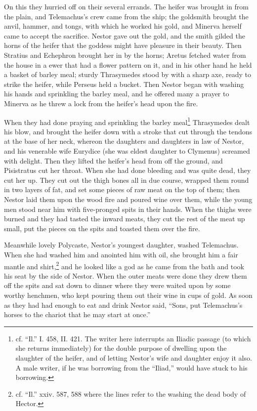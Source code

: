 On this they hurried off on their several errands. The heifer was brought in
from the plain, and Telemachus’s crew came from the ship; the goldsmith brought
the anvil, hammer, and tongs, with which he worked his gold, and Minerva
herself came to accept the sacrifice. Nestor gave out the gold, and the smith
gilded the horns of the heifer that the goddess might have pleasure in their
beauty. Then Stratius and Echephron brought her in by the horns; Aretus fetched
water from the house in a ewer that had a flower pattern on it, and in his
other hand he held a basket of barley meal; sturdy Thrasymedes stood by with a
sharp axe, ready to strike the heifer, while Perseus held a bucket. Then Nestor
began with washing his hands and sprinkling the barley meal, and he offered
many a prayer to Minerva as he threw a lock from the heifer’s head upon the
fire.

When they had done praying and sprinkling the barley meal\footnote{cf. “Il.” I. 458, II. 421. The writer here interrupts an Iliadic passage (to
which she returns immediately) for the double purpose of dwelling upon the
slaughter of the heifer, and of letting Nestor’s wife and daughter enjoy it
also. A male writer, if he was borrowing from the “Iliad,” would have stuck to
his borrowing.} Thrasymedes dealt his blow, and
brought the heifer down with a stroke that cut through the tendons at the base
of her neck, whereon the daughters and daughters in law of Nestor, and his
venerable wife Eurydice (she was eldest daughter to Clymenus) screamed with
delight. Then they lifted the heifer’s head from off the ground, and
Pisistratus cut her throat. When she had done bleeding and was quite dead, they
cut her up. They cut out the thigh bones all in due course, wrapped them round
in two layers of fat, and set some pieces of raw meat on the top of them; then
Nestor laid them upon the wood fire and poured wine over them, while the young
men stood near him with five-pronged spits in their hands. When the thighs were
burned and they had tasted the inward meats, they cut the rest of the meat up
small, put the pieces on the spits and toasted them over the fire.

Meanwhile lovely Polycaste, Nestor’s youngest daughter, washed Telemachus. When
she had washed him and anointed him with oil, she brought him a fair mantle and
shirt,\footnote{cf. “Il.” xxiv. 587, 588 where the lines refer to the washing the dead body
of Hector.} and he
looked like a god as he came from the bath and took his seat by the side of
Nestor. When the outer meats were done they drew them off the spits and sat
down to dinner where they were waited upon by some worthy henchmen, who kept
pouring them out their wine in cups of gold. As soon as they had had enough to
eat and drink Nestor said, “Sons, put Telemachus’s horses to the chariot that
he may start at once.”

